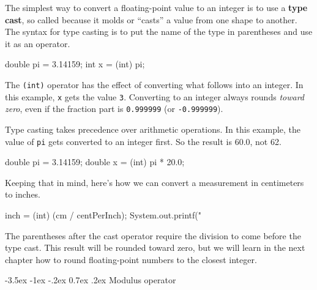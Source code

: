 \documentclass[12pt]{book}
\makeatletter
\theoremstyle{exercise}
\newcommand{\java}[1]{\verb"#1"}
\renewcommand{\section}{\@startsection{section}{1}{\z@}%
    {-3.5ex \@plus -1ex \@minus -.2ex}%
    {0.7ex \@plus.2ex}%
    {\normalfont\Large\bfseries}}
\newcommand{\java}[1]{\lstinline{#1}} %
\makeatother
\begin{document}


The simplest way to convert a floating-point value to an integer is to use a {\bf type cast}, so called because it molds or ``casts'' a value from one shape to another.
The syntax for type casting is to put the name of the type in parentheses and use it as an operator.

\begin{code}
    double pi = 3.14159;
    int x = (int) pi;
\end{code}


The \java{(int)} operator has the effect of converting what follows into an integer.
In this example, \java{x} gets the value \java{3}.
Converting to an integer always rounds {\em toward zero}, even if the fraction part is \java{0.999999} (or \java{-0.999999}).

Type casting takes precedence over arithmetic operations.
In this example, the value of \java{pi} gets converted to an integer first.
So the result is 60.0, not 62.

\begin{code}
    double pi = 3.14159;
    double x = (int) pi * 20.0;
\end{code}


Keeping that in mind, here's how we can convert a measurement in centimeters to inches.

\begin{code}
    inch = (int) (cm / centPerInch);
    System.out.printf("%
\end{code}

The parentheses after the cast operator require the division to come before the type cast.
This result will be rounded toward zero, but we will learn in the next chapter how to round floating-point numbers to the closest integer.

\section{Modulus operator}
\end{document}
